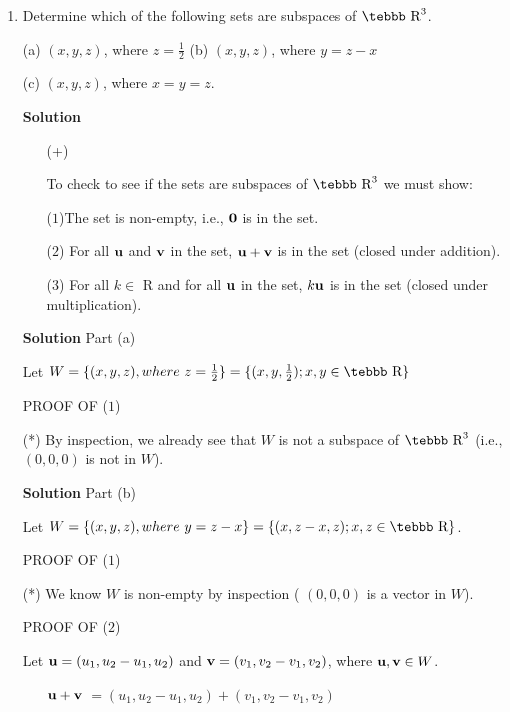\begin{enumerate}

\item Determine which of the following sets are subspaces of
$\mbox{\tebbb R}^3$.

(a) $(x,y,z)$, where $z=\frac{1}{2}$ \quad \quad (b) $(x,y,z)$,
where $y=z-x$

(c) $(x,y,z)$, where $x=y=z$.

\noindent \textbf{Solution}

\begin{enumerate} \item[(+)]

\noindent To check to see if the sets are subspaces of
$\mbox{\tebbb R}^3$ we must show:

($1$)The set is non-empty, i.e., ${\bf 0}$ is in the set.

($2$) For all ${\bf u}$ and ${\bf v}$ in the set, ${\bf u} + {\bf
v}$ is in the set (closed under addition).

($3$) For all $k\in$ {\tebbb R} and for all ${\bf u}$ in the set,
$k{\bf u}$ is in the set (closed under multiplication).

\end{enumerate}

\noindent \textbf{Solution} Part (a)

\noindent Let $W=\{(x,y,z),where\
z=\frac{1}{2}\}=\{(x,y,\frac{1}{2}); x,y\in \mbox{\tebbb R}\}$

\noindent PROOF OF ($1$)

\noindent (*) By inspection, we already see that $W$ is not a
subspace of $\mbox{\tebbb R}^3$ (i.e., $(0,0,0)$ is not in $W$).

\smallskip

\noindent \textbf{Solution} Part (b)

\noindent Let $W=\{(x,y,z), where\ y=z-x\}=\{(x,z-x,z); x,z\in
\mbox{\tebbb R}\}$.

\noindent PROOF OF ($1$)

\noindent (*) We know $W$ is non-empty by inspection ( $(0,0,0)$
is a vector in $W$).


\noindent PROOF OF ($2$)

\noindent Let ${\bf u}=(u_{1},u_{2}-u_1,u_{2})$ and ${\bf
v}=(v_{1},v_{2}-v_1,v_{2})$, where ${\bf u},{\bf v}\in W$.

\begin{enumerate} \item[${\bf u}+{\bf v}$]
$=(u_{1},u_{2}-u_1,u_{2})+(v_{1},v_{2}-v_1,v_{2})$


\end{enumerate}
\end{enumerate}

